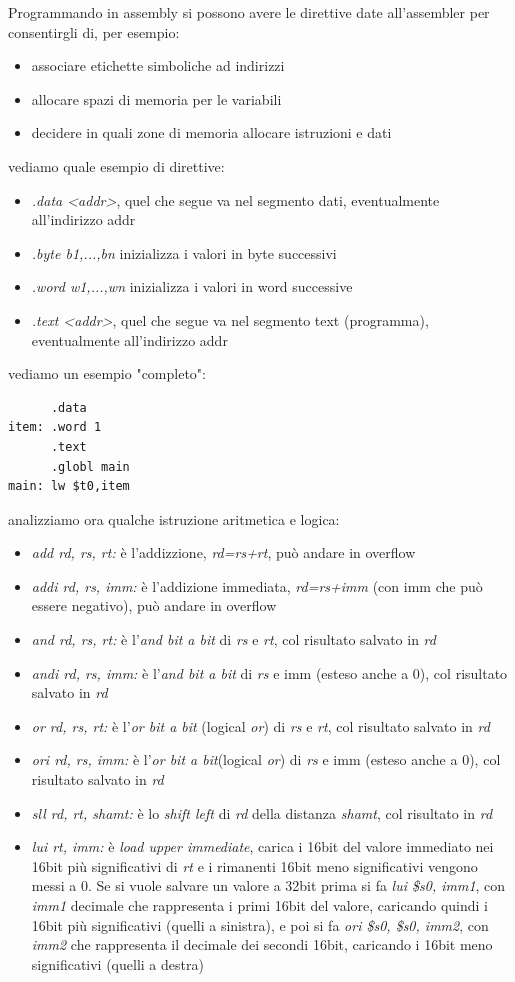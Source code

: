 \documentclass[a4paper,12pt, oneside]{book}
\begin{document}
\newpage
Programmando in assembly si possono avere le direttive date all'assembler per consentirgli di, per esempio:
\begin{itemize}
\item associare etichette simboliche ad indirizzi
\item allocare spazi di memoria per le variabili
\item decidere in quali zone di memoria allocare istruzioni e dati
\end{itemize}
vediamo quale esempio di direttive:
\begin{itemize}
\item \textit{.data <addr>}, quel che segue va nel segmento dati, eventualmente all'indirizzo addr
\item \textit{.byte b1,...,bn} inizializza i valori in byte successivi
\item \textit{.word w1,...,wn} inizializza i valori in word successive
\item \textit{.text <addr>}, quel che segue va nel segmento text (programma), eventualmente all'indirizzo addr
\end{itemize}
vediamo un esempio "completo":
\begin{verbatim}
      .data
item: .word 1
      .text
      .globl main
main: lw $t0,item
\end{verbatim}
analizziamo ora qualche istruzione aritmetica e logica:
\begin{itemize}
\item \textit{add rd, rs, rt:} è l'addizzione, \textit{rd=rs+rt}, può andare in overflow
\item \textit{addi rd, rs, imm:} è l'addizione immediata, \textit{rd=rs+imm} (con imm che può essere negativo), può andare in overflow
\item \textit{and rd, rs, rt:} è l'\textit{and bit a bit} di \textit{rs} e \textit{rt}, col risultato salvato in \textit{rd}
\item \textit{andi rd, rs, imm:} è l'\textit{and bit a bit} di \textit{rs} e imm (esteso anche a 0), col risultato salvato in \textit{rd}
\item \textit{or rd, rs, rt:} è l'\textit{or bit a bit} (logical \textit{or}) di \textit{rs} e \textit{rt}, col risultato salvato in \textit{rd}
\item \textit{ori rd, rs, imm:} è l'\textit{or bit a bit}(logical \textit{or}) di \textit{rs} e imm (esteso anche a 0), col risultato salvato in \textit{rd}
\item \textit{sll rd, rt, shamt:} è lo \textit{shift left} di \textit{rd} della distanza \textit{shamt}, col risultato in \textit{rd}
\item \textit{lui rt, imm:} è \textit{load upper immediate}, carica i 16bit del valore immediato nei 16bit più significativi di \textit{rt} e i rimanenti 16bit meno significativi vengono messi a 0. Se si vuole salvare un valore a 32bit prima si fa \textit{lui \$s0, imm1}, con \textit{imm1} decimale che rappresenta i primi 16bit del valore, caricando quindi i 16bit più significativi (quelli a sinistra), e poi si fa \textit{ori \$s0, \$s0, imm2}, con \textit{imm2} che rappresenta il decimale dei secondi 16bit, caricando i 16bit meno significativi (quelli a destra)
\end{itemize}
\end{document}
